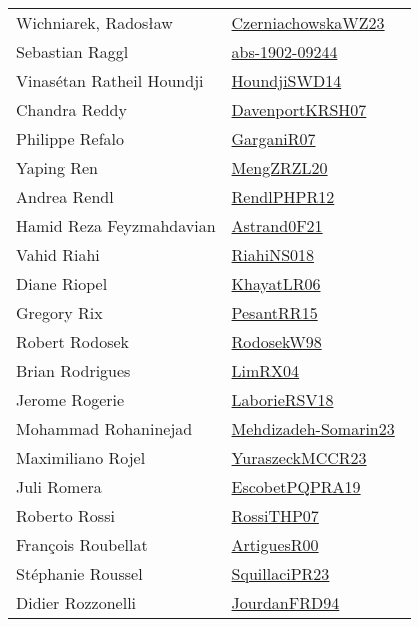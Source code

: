 {\begin{longtable}{p{4cm}p{20cm}}
Wichniarek, Radosław & \href{works/CzerniachowskaWZ23.pdf}{CzerniachowskaWZ23}~\cite{CzerniachowskaWZ23}\\
Sebastian Raggl & \href{works/abs-1902-09244.pdf}{abs-1902-09244}~\cite{abs-1902-09244}\\
Vinas{\'{e}}tan Ratheil Houndji & \href{works/HoundjiSWD14.pdf}{HoundjiSWD14}~\cite{HoundjiSWD14}\\
Chandra Reddy & \href{works/DavenportKRSH07.pdf}{DavenportKRSH07}~\cite{DavenportKRSH07}\\
Philippe Refalo & \href{works/GarganiR07.pdf}{GarganiR07}~\cite{GarganiR07}\\
Yaping Ren & \href{works/MengZRZL20.pdf}{MengZRZL20}~\cite{MengZRZL20}\\
Andrea Rendl & \href{works/RendlPHPR12.pdf}{RendlPHPR12}~\cite{RendlPHPR12}\\
Hamid Reza Feyzmahdavian & \href{works/Astrand0F21.pdf}{Astrand0F21}~\cite{Astrand0F21}\\
Vahid Riahi & \href{works/RiahiNS018.pdf}{RiahiNS018}~\cite{RiahiNS018}\\
Diane Riopel & \href{works/KhayatLR06.pdf}{KhayatLR06}~\cite{KhayatLR06}\\
Gregory Rix & \href{works/PesantRR15.pdf}{PesantRR15}~\cite{PesantRR15}\\
Robert Rodosek & \href{works/RodosekW98.pdf}{RodosekW98}~\cite{RodosekW98}\\
Brian Rodrigues & \href{works/LimRX04.pdf}{LimRX04}~\cite{LimRX04}\\
Jerome Rogerie & \href{works/LaborieRSV18.pdf}{LaborieRSV18}~\cite{LaborieRSV18}\\
Mohammad Rohaninejad & \href{works/Mehdizadeh-Somarin23.pdf}{Mehdizadeh-Somarin23}~\cite{Mehdizadeh-Somarin23}\\
Maximiliano Rojel & \href{works/YuraszeckMCCR23.pdf}{YuraszeckMCCR23}~\cite{YuraszeckMCCR23}\\
Juli Romera & \href{works/EscobetPQPRA19.pdf}{EscobetPQPRA19}~\cite{EscobetPQPRA19}\\
Roberto Rossi & \href{works/RossiTHP07.pdf}{RossiTHP07}~\cite{RossiTHP07}\\
Fran{\c{c}}ois Roubellat & \href{works/ArtiguesR00.pdf}{ArtiguesR00}~\cite{ArtiguesR00}\\
St{\'{e}}phanie Roussel & \href{works/SquillaciPR23.pdf}{SquillaciPR23}~\cite{SquillaciPR23}\\
Didier Rozzonelli & \href{}{JourdanFRD94}~\cite{JourdanFRD94}\\

\end{longtable}}
